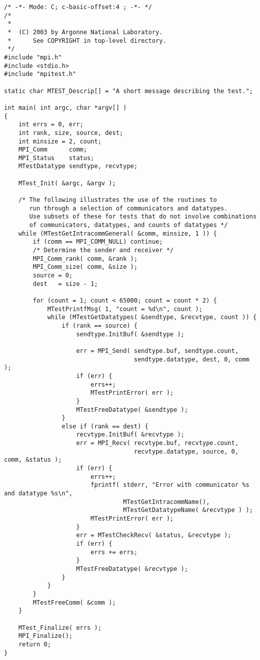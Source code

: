 \begin{verbatim}
/* -*- Mode: C; c-basic-offset:4 ; -*- */
/*
 *
 *  (C) 2003 by Argonne National Laboratory.
 *      See COPYRIGHT in top-level directory.
 */
#include "mpi.h"
#include <stdio.h>
#include "mpitest.h"

static char MTEST_Descrip[] = "A short message describing the test.";

int main( int argc, char *argv[] )
{
    int errs = 0, err;
    int rank, size, source, dest;
    int minsize = 2, count; 
    MPI_Comm      comm;
    MPI_Status    status;
    MTestDatatype sendtype, recvtype;

    MTest_Init( &argc, &argv );

    /* The following illustrates the use of the routines to 
       run through a selection of communicators and datatypes.
       Use subsets of these for tests that do not involve combinations 
       of communicators, datatypes, and counts of datatypes */
    while (MTestGetIntracommGeneral( &comm, minsize, 1 )) {
        if (comm == MPI_COMM_NULL) continue;
        /* Determine the sender and receiver */
        MPI_Comm_rank( comm, &rank );
        MPI_Comm_size( comm, &size );
        source = 0;
        dest   = size - 1;
        
        for (count = 1; count < 65000; count = count * 2) {
            MTestPrintfMsg( 1, "count = %d\n", count );
            while (MTestGetDatatypes( &sendtype, &recvtype, count )) {
                if (rank == source) {
                    sendtype.InitBuf( &sendtype );
                    
                    err = MPI_Send( sendtype.buf, sendtype.count, 
                                    sendtype.datatype, dest, 0, comm );
                    if (err) {
                        errs++;
                        MTestPrintError( err );
                    }
                    MTestFreeDatatype( &sendtype );
                }
                else if (rank == dest) {
                    recvtype.InitBuf( &recvtype );
                    err = MPI_Recv( recvtype.buf, recvtype.count, 
                                    recvtype.datatype, source, 0, comm, &status );
                    if (err) {
                        errs++;
                        fprintf( stderr, "Error with communicator %s and datatype %s\n", 
                                 MTestGetIntracommName(), 
                                 MTestGetDatatypeName( &recvtype ) );
                        MTestPrintError( err );
                    }
                    err = MTestCheckRecv( &status, &recvtype );
                    if (err) {
                        errs += errs;
                    }
                    MTestFreeDatatype( &recvtype );
                }
            }
        }
        MTestFreeComm( &comm );
    }

    MTest_Finalize( errs );
    MPI_Finalize();
    return 0;
}
\end{verbatim}

